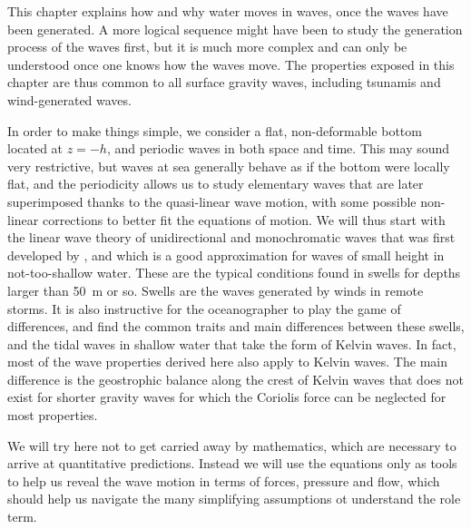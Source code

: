 This chapter explains how and why water moves in waves, once the waves have been generated. 
A more logical sequence might have been to study the generation process of the waves first, but it is much more complex 
and can only be understood once one knows how the waves move. The properties exposed in this chapter
are thus common to all surface gravity waves, including tsunamis and wind-generated waves. 

In order to make things simple, we consider a flat, non-deformable bottom 
located at $z=-h$, and periodic waves in both space and time. This may sound very restrictive, but waves at 
sea generally behave as if the bottom were locally flat, and the periodicity allows us to study elementary waves 
that are later superimposed thanks to the quasi-linear wave motion, with some possible non-linear corrections to better fit
the equations of motion. We will thus start with the linear wave theory of unidirectional and monochromatic 
waves that was first developed by  \cite{Airy1841}, and which is a good approximation for waves of small height in not-too-shallow water. 
These are the typical conditions found in swells for depths larger than 50~m or so. Swells are the waves generated by winds in remote storms. 
It is also instructive for the oceanographer to play the game of differences, and find the common traits and main differences 
between these swells, and the tidal waves in shallow water that take the form of  Kelvin waves. In fact, most 
of the wave properties derived here also apply to Kelvin waves. The main difference is the geostrophic balance along the crest of Kelvin waves 
that does not exist for shorter gravity waves for which the Coriolis force can be neglected for most properties. 


We will try here not to get carried away by mathematics, which are necessary to arrive at quantitative predictions.
Instead we will use the equations only as tools to help us reveal the wave motion in terms of forces, pressure and flow, which should 
help us navigate the many simplifying assumptions ot understand the role term. 


